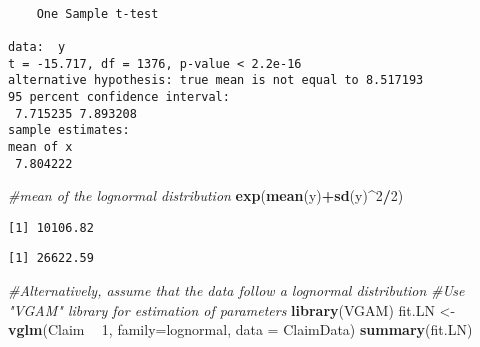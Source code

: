\documentclass[]{book}
\newenvironment{Shaded}{\begin{snugshade}}{\end{snugshade}}
\newcommand{\KeywordTok}[1]{\textcolor[rgb]{0.13,0.29,0.53}{\textbf{#1}}}
\newcommand{\DataTypeTok}[1]{\textcolor[rgb]{0.13,0.29,0.53}{#1}}
\newcommand{\DecValTok}[1]{\textcolor[rgb]{0.00,0.00,0.81}{#1}}
\newcommand{\StringTok}[1]{\textcolor[rgb]{0.31,0.60,0.02}{#1}}
\newcommand{\CommentTok}[1]{\textcolor[rgb]{0.56,0.35,0.01}{\textit{#1}}}
\newcommand{\OperatorTok}[1]{\textcolor[rgb]{0.81,0.36,0.00}{\textbf{#1}}}
\newcommand{\NormalTok}[1]{#1}
\theoremstyle{definition}
\theoremstyle{definition}
\theoremstyle{definition}
\theoremstyle{remark}
\begin{document}
\begin{verbatim}

    One Sample t-test

data:  y
t = -15.717, df = 1376, p-value < 2.2e-16
alternative hypothesis: true mean is not equal to 8.517193
95 percent confidence interval:
 7.715235 7.893208
sample estimates:
mean of x 
 7.804222 
\end{verbatim}

\begin{Shaded}
\begin{Highlighting}[]
\CommentTok{#mean of the lognormal distribution}
\KeywordTok{exp}\NormalTok{(}\KeywordTok{mean}\NormalTok{(y)}\OperatorTok{+}\KeywordTok{sd}\NormalTok{(y)}\OperatorTok{^}\DecValTok{2}\OperatorTok{/}\DecValTok{2}\NormalTok{)}
\end{Highlighting}
\end{Shaded}

\begin{verbatim}
[1] 10106.82
\end{verbatim}

\begin{Shaded}
\end{Shaded}

\begin{verbatim}
[1] 26622.59
\end{verbatim}

\begin{Shaded}
\begin{Highlighting}[]
\CommentTok{#Alternatively, assume that the data follow a lognormal distribution}
\CommentTok{#Use "VGAM" library for estimation of parameters }
\KeywordTok{library}\NormalTok{(VGAM)}
\NormalTok{fit.LN <-}\StringTok{ }\KeywordTok{vglm}\NormalTok{(Claim }\OperatorTok{~}\StringTok{ }\DecValTok{1}\NormalTok{, }\DataTypeTok{family=}\NormalTok{lognormal, }\DataTypeTok{data =}\NormalTok{ ClaimData)}
\KeywordTok{summary}\NormalTok{(fit.LN)}
\end{Highlighting}
\end{Shaded}
\end{document}

